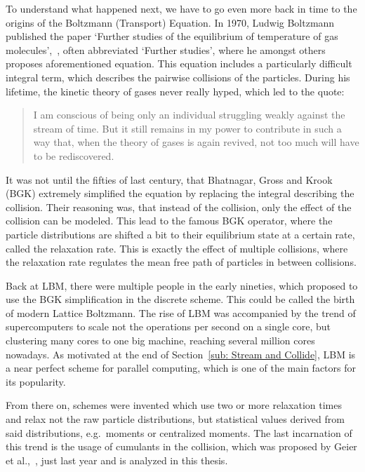 To understand what happened next, we have to go even more back in time to the origins of the Boltzmann (Transport) Equation. In 1970, Ludwig Boltzmann published the paper `Further studies of the equilibrium of temperature of gas molecules',~\cite{Boltzmann1970}, often abbreviated `Further studies', where he amongst others proposes aforementioned equation. This equation includes a particularly difficult integral term, which describes the pairwise collisions of the particles. During his lifetime, the kinetic theory of gases never really hyped, which led to the quote:
\begin{quotation}
I am conscious of being only an individual struggling weakly against the stream of time. But it still remains in my power to contribute in such a way that, when the theory of gases is again revived, not too much will have to be rediscovered.
\end{quotation}
It was not until the fifties of last century, that Bhatnagar, Gross and Krook (BGK) extremely simplified the equation by replacing the integral describing the collision. Their reasoning was, that instead of the collision, only the effect of the collision can be modeled. This lead to the famous BGK operator, where the particle distributions are shifted a bit to their equilibrium state at a certain rate, called the relaxation rate. This is exactly the effect of multiple collisions, where the relaxation rate regulates the mean free path of particles in between collisions.

Back at LBM, there were multiple people in the early nineties, which proposed to use the BGK simplification in the discrete scheme. This could be called the birth of modern Lattice Boltzmann. The rise of LBM was accompanied by the trend of supercomputers to scale not the operations per second on a single core, but clustering many cores to one big machine, reaching several million cores nowadays. As motivated at the end of Section~\ref{sub: Stream and Collide}, LBM is a near perfect scheme for parallel computing, which is one of the main factors for its popularity.

From there on, schemes were invented which use two or more relaxation times and relax not the raw particle distributions, but statistical values derived from said distributions, e.g.\ moments or centralized moments. The last incarnation of this trend is the usage of cumulants in the collision, which was proposed by Geier et al.,~\cite{geier2015cumulant}, just last year and is analyzed in this thesis.

